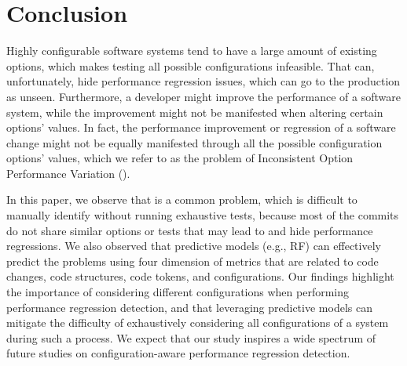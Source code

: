 
\section{Conclusion}
\label{sec:conclusion}

Highly configurable software systems tend to have a large amount of existing options, which makes testing all possible configurations infeasible. That can, unfortunately, hide performance regression issues, which can go to the production as unseen. Furthermore, a developer might improve the performance of a software system, while the improvement might not be manifested when altering certain options' values. In fact, the performance improvement or regression of a software change might not be equally manifested through all the possible configuration options' values, which we refer to as the problem of Inconsistent Option Performance Variation (\inconsistent).

In this paper, %
we observe that \inconsistent is a common problem, which is difficult to manually identify without running exhaustive tests, because most of the commits do not share similar options or tests that may lead to \inconsistent and hide performance regressions.
We also observed that predictive models (e.g., RF) can effectively predict the \inconsistent problems using four dimension of metrics that are related to code changes, code structures, code tokens, and configurations. 
Our findings highlight the importance of considering different configurations when performing performance regression detection, and that leveraging predictive models can mitigate the difficulty of exhaustively considering all configurations of a system during such a process. 
We expect that our study inspires a wide spectrum of future studies on configuration-aware performance regression detection.


